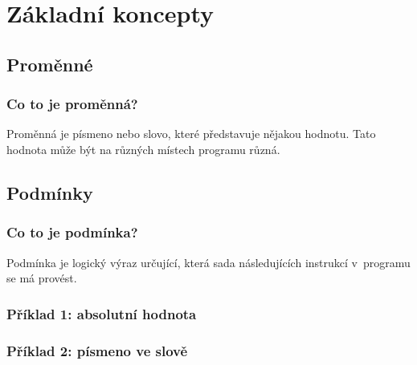 \documentclass[aspectratio=169,11pt,handout]{beamer}
\begin{document}
\section[Základní koncepty]{Základní koncepty}
\subsection[Proměnné]{Proměnné}

\begin{frame}
 \frametitle{Co to je proměnná?}
 \begin{tcolorbox}[title=Proměnná,center,width=.9\textwidth]
  Proměnná je písmeno nebo slovo, které \alert{představuje nějakou hodnotu}.
  Tato hodnota může být na různých místech programu různá.
 \end{tcolorbox}
\end{frame}

\subsection[Podmínky]{Podmínky}

\begin{frame}
 \frametitle{Co to je podmínka?}
 \begin{tcolorbox}[title=Podmínka,center,width=.9\textwidth]
  Podmínka je \alert{logický výraz} určující, která sada následujících instrukcí
  v~programu se má provést.
 \end{tcolorbox}
\end{frame}

\begin{frame}
 \frametitle{Příklad 1: absolutní hodnota}
 \centering
 \begin{minipage}{.8\textwidth}
  \begin{algorithm}[H]
   \DontPrintSemicolon
   \BlankLine

  \end{algorithm}
 \end{minipage}
\end{frame}

\begin{frame}
 \frametitle{Příklad 2: písmeno ve slově}
 \centering
 \begin{minipage}{.9\textwidth}
  \begin{algorithm}[H]
   \DontPrintSemicolon

   \BlankLine
  \end{algorithm}
 \end{minipage}
\end{frame}
\end{document}
